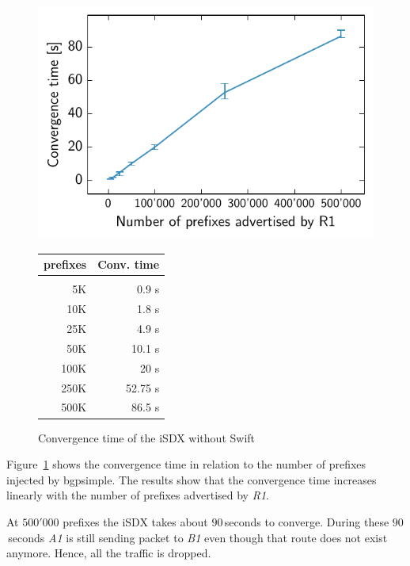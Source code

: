 \begin{figure}
\centering
\begin{minipage}[t]{.4\textwidth}
\centering
\vspace{0pt}
\includegraphics[scale = 1]{Figures/noswift.pdf}
\end{minipage}\hfill
\begin{minipage}[t]{.4\textwidth}
\centering
\vspace{0pt}
\begin{tabular}{@{}rr@{}}
	\\
	prefixes & Conv. time \\
	\hline
	\\
    5K & 0.9 s  \\
    10K & 1.8 s   \\
    25K & 4.9 s   \\
    50K & 10.1 s  \\
    100K & 20 s \\
    250K & 52.75 s   \\
    500K & 86.5 s  \\
\end{tabular}
\end{minipage}
\caption{Convergence time of the iSDX without Swift}
\label{fig:noswift}
\end{figure}

Figure~\ref{fig:noswift} shows the convergence time in relation to the number of prefixes injected by bgpsimple. The results show that the convergence time increases linearly with the number of prefixes advertised by \emph{R1}.

At $500'000$ prefixes the iSDX takes about $90$\,seconds to converge. During these $90$\,seconds \emph{A1} is still sending packet to \emph{B1} even though that route does not exist anymore. Hence, all the traffic is dropped. 

